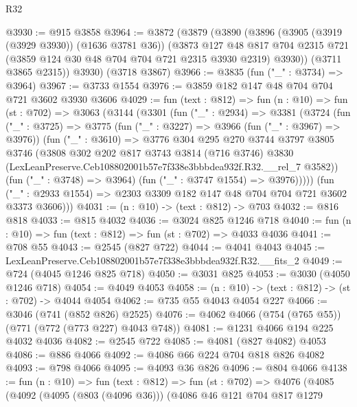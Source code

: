 \begin{lexlean}{R32}
\begin{coremodule}
@3930 := @915 @3858
@3964 := @3872
    (@3879
      (@3890
        (@3896
          (@3905 (@3919 (@3929 @3930)) (@1636 @3781 @36))
          (@3873
            @127
            @48
            @817
            @704
            @2315
            @721
            (@3859 @124 @30 @48 @704 @704 @721 @2315 @3930 @2319)
            @3930))
        (@3711 @3865 @2315))
      @3930)
    (@3718 @3867)
@3966 := @3835 (fun ("_" : @3734) => @3964)
@3967 := @3733 @1554
@3976 := @3859 @182 @147 @48 @704 @704 @721 @3602 @3930 @3606
@4029 := fun (text : @812) =>
  fun (n : @10) =>
  fun (st : @702) =>
  @3063
    (@3144
      (@3301
        (fun ("_" : @2934) =>
        @3381
          (@3724
            (fun ("_" : @3725) =>
            @3775
              (fun ("_" : @3227) => @3966 (fun ("_" : @3967) => @3976))
              (fun ("_" : @3610) =>
              @3776
                @304
                @295
                @270
                @3744
                @3797
                @3805
                @3746
                (@3808
                  @302
                  @202
                  @817
                  @3743
                  @3814
                  (@716 @3746)
                  @3830
                  (LexLeanPreserve.Ceb108802001b57e7f338e3bbbdea932f.R32.__rel_7 @3582))
                (fun ("_" : @3748) => @3964)
                (fun ("_" : @3747 @1554) => @3976)))))
        (fun ("_" : @2933 @1554) => @2303 @3309 @182 @147 @48 @704 @704 @721 @3602 @3373 @3606)))
@4031 := (n : @10) -> (text : @812) -> @703
@4032 := @816 @818
@4033 := @815 @4032
@4036 := @3024 @825 @1246 @718
@4040 := fun (n : @10) => fun (text : @812) => fun (st : @702) => @4033 @4036
@4041 := @708 @55
@4043 := @2545 (@827 @722)
@4044 := @4041 @4043
@4045 := LexLeanPreserve.Ceb108802001b57e7f338e3bbbdea932f.R32.__fits_2
@4049 := @724 (@4045 @1246 @825 @718)
@4050 := @3031 @825
@4053 := @3030 (@4050 @1246 @718)
@4054 := @4049 @4053
@4058 := (n : @10) -> (text : @812) -> (st : @702) -> @4044 @4054
@4062 := @735 @55 @4043 @4054 @227
@4066 := @3046 (@741 (@852 @826) @2525)
@4076 := @4062 @4066 (@754 (@765 @55)) (@771 (@772 (@773 @227) @4043 @748))
@4081 := @1231 @4066 @194 @225 @4032 @4036
@4082 := @2545 @722
@4085 := @4081 (@827 @4082) @4053
@4086 := @886 @4066
@4092 := @4086 @66 @224 @704 @818 @826 @4082
@4093 := @798 @4066
@4095 := @4093 @36 @826
@4096 := @804 @4066
@4138 := fun (n : @10) =>
  fun (text : @812) =>
  fun (st : @702) =>
  @4076
    (@4085
      (@4092
        (@4095 (@803 (@4096 @36)))
        (@4086
          @46
          @121
          @704
          @817
          @1279

\end{coremodule}
\end{lexlean}
